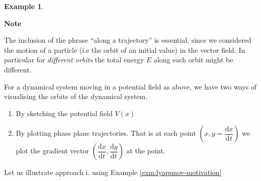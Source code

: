 \documentclass[
  a4paper,
  oneside,
  final]{krantz}
\providecommand{\tightlist}{%
  \setlength{\itemsep}{0pt}\setlength{\parskip}{0pt}}
\renewcommand{\d}{\mathrm{d}}
\newcommand{\der}[2]{\dfrac{\d #1}{\d #2}}
\theoremstyle{definition}
\theoremstyle{definition}
\newtheorem{example}{Example}[chapter]
\theoremstyle{definition}
\theoremstyle{definition}
\theoremstyle{remark}
\begin{document}
\begin{example}
\begin{palegreenbox}

\begin{center}
\textbf{Note}

\end{center}

The inclusion of the phrase ``along a trajectory'' is essential, since we considered the motion of a particle (i.e the orbit of an initial value) in the vector field. In particular for \emph{different orbits} the total energy \(E\) along each orbit might be different.

\end{palegreenbox}

\end{example}

For a dynamical system moving in a potential field as above, we have two ways of visualising the orbits of the dynamical system.

\begin{enumerate}
\def\labelenumi{\roman{enumi}.}
\tightlist
\item
  By sketching the potential field \(V(x)\)
\item
  By plotting phase plane trajectories. That is at each point \(\left(x, y = \der{x}{t}\right)\) we plot the gradient vector \(\left( \der{x}{t}, \der{y}{t}\right)\) at the point.
\end{enumerate}

Let us illustrate approach i. using Example \ref{exm:lyapunov-motivation}
\end{document}
